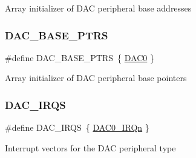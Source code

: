 Array initializer of D\+AC peripheral base addresses \mbox{\label{group___d_a_c___peripheral___access___layer_gab47690040e4d63adc4f324358c27157a}} 
\subsubsection{\texorpdfstring{DAC\_BASE\_PTRS}{DAC\_BASE\_PTRS}}
{\footnotesize\ttfamily \#define D\+A\+C\+\_\+\+B\+A\+S\+E\+\_\+\+P\+T\+RS~\{ \mbox{\hyperlink{group___d_a_c___peripheral___access___layer_gadfe0025fe66918c644e110c3b055c955}{D\+A\+C0}} \}}

Array initializer of D\+AC peripheral base pointers \mbox{\label{group___d_a_c___peripheral___access___layer_gac003cc87c636841f96fbf9084f536c43}} 
\subsubsection{\texorpdfstring{DAC\_IRQS}{DAC\_IRQS}}
{\footnotesize\ttfamily \#define D\+A\+C\+\_\+\+I\+R\+QS~\{ \mbox{\hyperlink{group___interrupt__vector__numbers_gga666eb0caeb12ec0e281415592ae89083a6029e7bffa10f584e060a5448a456927}{D\+A\+C0\+\_\+\+I\+R\+Qn}} \}}

Interrupt vectors for the D\+AC peripheral type 